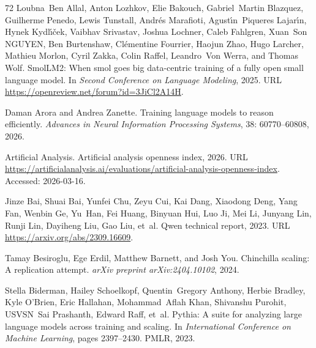 \begin{thebibliography}{72}
Loubna~Ben Allal, Anton Lozhkov, Elie Bakouch, Gabriel~Martin Blazquez, Guilherme Penedo, Lewis Tunstall, Andr{\'e}s Marafioti, Agust{\'\i}n~Piqueres Lajar{\'\i}n, Hynek Kydl{\'\i}{\v{c}}ek, Vaibhav Srivastav, Joshua Lochner, Caleb Fahlgren, Xuan~Son NGUYEN, Ben Burtenshaw, Cl{\'e}mentine Fourrier, Haojun Zhao, Hugo Larcher, Mathieu Morlon, Cyril Zakka, Colin Raffel, Leandro~Von Werra, and Thomas Wolf.
\newblock Smol{LM}2: When smol goes big {\textemdash} data-centric training of a fully open small language model.
\newblock In \emph{Second Conference on Language Modeling}, 2025.
\newblock URL \url{https://openreview.net/forum?id=3JiCl2A14H}.

Daman Arora and Andrea Zanette.
\newblock Training language models to reason efficiently.
\newblock \emph{Advances in Neural Information Processing Systems}, 38: 60770--60808, 2026.

{Artificial Analysis}.
\newblock Artificial analysis openness index, 2026.
\newblock URL \url{https://artificialanalysis.ai/evaluations/artificial-analysis-openness-index}.
\newblock Accessed: 2026-03-16.

Jinze Bai, Shuai Bai, Yunfei Chu, Zeyu Cui, Kai Dang, Xiaodong Deng, Yang Fan, Wenbin Ge, Yu~Han, Fei Huang, Binyuan Hui, Luo Ji, Mei Li, Junyang Lin, Runji Lin, Dayiheng Liu, Gao Liu, et~al.
\newblock Qwen technical report, 2023.
\newblock URL \url{https://arxiv.org/abs/2309.16609}.

Tamay Besiroglu, Ege Erdil, Matthew Barnett, and Josh You.
\newblock Chinchilla scaling: A replication attempt.
\newblock \emph{arXiv preprint arXiv:2404.10102}, 2024.

Stella Biderman, Hailey Schoelkopf, Quentin~Gregory Anthony, Herbie Bradley, Kyle O'Brien, Eric Hallahan, Mohammad~Aflah Khan, Shivanshu Purohit, USVSN~Sai Prashanth, Edward Raff, et~al.
\newblock Pythia: A suite for analyzing large language models across training and scaling.
\newblock In \emph{International Conference on Machine Learning}, pages 2397--2430. PMLR, 2023.


\end{thebibliography}
